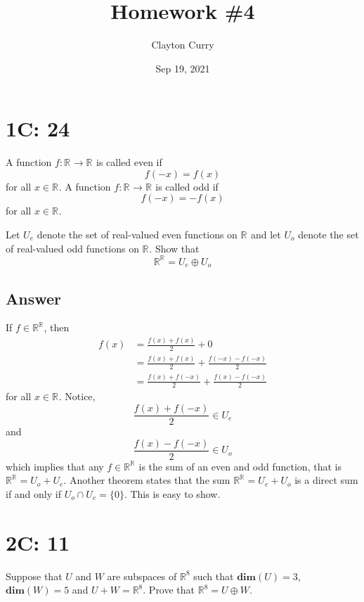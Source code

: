 \documentclass[
	12pt, %
]{fphw}
\title{Homework \#4} %
\author{Clayton Curry} %
\date{Sep 19, 2021} %
\institute{University of Oklahoma \\ Department of Mathematics} %
\newcommand\0{\mathbf{0}}
\newcommand\set[1]{\{#1\}}
\newcommand\qed{\text{$\blacksquare$}}
\newcommand\R[1]{\text{$\mathbb{R}^{#1}$}}
\renewcommand\dim[1]{\mathbf{dim}(#1)}
\begin{document}
\maketitle %


\section*{1C: 24}

\begin{problem}
A function $f : \R{} \to \R{}$ is called even if
$$
f(-x) = f (x)
$$
for all $x \in \R{}$. A function $f : \R{} \to \R{}$ is called odd if
$$
f(-x) = -f(x)
$$
for all $x \in \R{}$. 

Let $U_e$ denote the set of real-valued even functions on $\R{}$ and let $U_o$ denote the set of real-valued odd functions on $\R{}$. Show that
$$
\R{\R{}} = U_e \oplus U_o
$$
\end{problem}


\subsection*{Answer} 
If $f \in \R{\R{}}$, then
\begin{align*}
f(x) &= \frac{f(x) + f(x)}{2} + 0\\
&=\frac{f(x) + f(x)}{2} + \frac{f(-x) - f(-x)}{2}\\
&=\frac{f(x) + f(-x)}{2} + \frac{f(x) - f(-x)}{2}
\end{align*}
for all $x \in \R{}$. Notice, 
$$
\frac{f(x) + f(-x)}{2} \in U_e
$$
and
$$
 \frac{f(x) - f(-x)}{2} \in U_o
$$
which implies that any $f \in \R{\R{}}$ is the sum of an even and odd function, that is $\R{\R{}} = U_o + U_e$.  Another theorem states that the sum $\R{\R{}} = U_e + U_o$ is a direct sum if and only if $U_o \cap U_e = \set{0}$. This is easy to show. \qed

\newpage
\section*{2C: 11}
\begin{problem}
Suppose that $U$ and $W$ are subspaces of $\R{8}$ such that $\dim{U} = 3$, $\dim{W} = 5$ and $U + W = \R{8}$. Prove that $\R{8} = U \oplus W$.
\end{problem}
\end{document}
